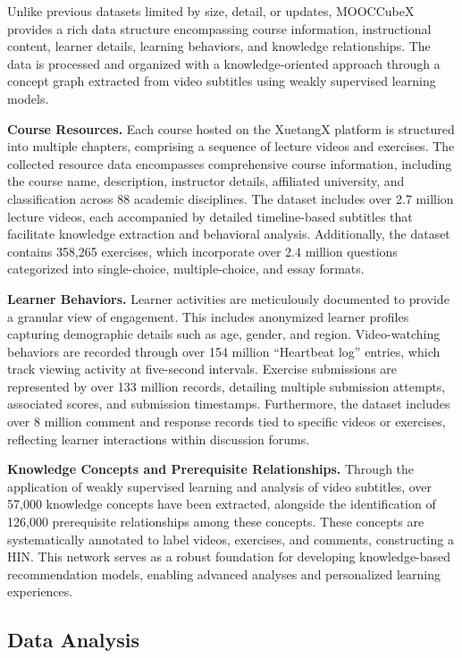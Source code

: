 \documentclass{ieeeaccess}
\begin{document}
Unlike previous datasets limited by size, detail, or updates, MOOCCubeX provides a rich data structure encompassing course information, instructional content, learner details, learning behaviors, and knowledge relationships. The data is processed and organized with a knowledge-oriented approach through a concept graph extracted from video subtitles using weakly supervised learning models.

\textbf{Course Resources.} Each course hosted on the XuetangX platform is structured into multiple chapters, comprising a sequence of lecture videos and exercises. The collected resource data encompasses comprehensive course information, including the course name, description, instructor details, affiliated university, and classification across 88 academic disciplines. The dataset includes over 2.7 million lecture videos, each accompanied by detailed timeline-based subtitles that facilitate knowledge extraction and behavioral analysis. Additionally, the dataset contains 358,265 exercises, which incorporate over 2.4 million questions categorized into single-choice, multiple-choice, and essay formats.

\textbf{Learner Behaviors.} Learner activities are meticulously documented to provide a granular view of engagement. This includes anonymized learner profiles capturing demographic details such as age, gender, and region. Video-watching behaviors are recorded through over 154 million ``Heartbeat log'' entries, which track viewing activity at five-second intervals. Exercise submissions are represented by over 133 million records, detailing multiple submission attempts, associated scores, and submission timestamps. Furthermore, the dataset includes over 8 million comment and response records tied to specific videos or exercises, reflecting learner interactions within discussion forums.

\textbf{Knowledge Concepts and Prerequisite Relationships.} Through the application of weakly supervised learning and analysis of video subtitles, over 57,000 knowledge concepts have been extracted, alongside the identification of 126,000 prerequisite relationships among these concepts. These concepts are systematically annotated to label videos, exercises, and comments, constructing a HIN. This network serves as a robust foundation for developing knowledge-based recommendation models, enabling advanced analyses and personalized learning experiences.

\subsection{Data Analysis}
\end{document}
